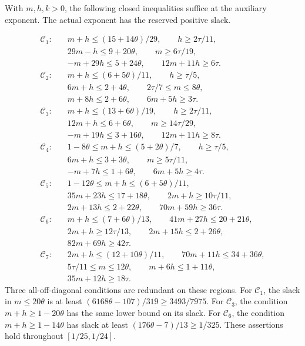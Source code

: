 {
With $m,h,k>0$, the following closed inequalities suffice at the
auxiliary exponent. The actual exponent has the reserved positive slack.\par}
\begin{align*}
\mathcal C_1:\quad
 &m+h\le(15+14\theta)/29,\qquad h\ge2\tau/11,\\
 &29m-h\le9+20\theta,\qquad m\ge6\tau/19,\\
 &-m+29h\le5+24\theta,\qquad12m+11h\ge6\tau.\\[4pt]
\mathcal C_2:\quad
 &m+h\le(6+5\theta)/11,\qquad h\ge\tau/5,\\
 &6m+h\le2+4\theta,\qquad2\tau/7\le m\le8\theta,\\
 &m+8h\le2+6\theta,\qquad6m+5h\ge3\tau.\\[4pt]
\mathcal C_3:\quad
 &m+h\le(13+6\theta)/19,\qquad h\ge2\tau/11,\\
 &12m+h\le6+6\theta,\qquad m\ge14\tau/29,\\
 &-m+19h\le3+16\theta,\qquad12m+11h\ge8\tau.\\[4pt]
\mathcal C_4:\quad
 &1-8\theta\le m+h\le(5+2\theta)/7,\qquad h\ge\tau/5,\\
 &6m+h\le3+3\theta,\qquad m\ge5\tau/11,\\
 &-m+7h\le1+6\theta,\qquad6m+5h\ge4\tau.\\[4pt]
\mathcal C_5:\quad
 &1-12\theta\le m+h\le(6+5\theta)/11,\\
 &35m+23h\le17+18\theta,\qquad2m+h\ge10\tau/11,\\
 &2m+13h\le2+22\theta,\qquad70m+59h\ge36\tau.\\[4pt]
\mathcal C_6:\quad
 &m+h\le(7+6\theta)/13,\qquad41m+27h\le20+21\theta,\\
 &2m+h\ge12\tau/13,\qquad2m+15h\le2+26\theta,\\
 &82m+69h\ge42\tau.\\[4pt]
\mathcal C_7:\quad
 &2m+h\le(12+10\theta)/11,\qquad70m+11h\le34+36\theta,\\
 &5\tau/11\le m\le12\theta,\qquad m+6h\le1+11\theta,\\
 &35m+12h\ge18\tau.
\end{align*}
Three all-off-diagonal conditions are redundant on these regions.
For $\mathcal C_1$, the slack in $m\le20\theta$ is at least
$(6168\theta-107)/319\ge3493/7975$.
For $\mathcal C_3$, the condition $m+h\ge1-20\theta$ has the same
lower bound on its slack. For $\mathcal C_6$, the condition
$m+h\ge1-14\theta$ has slack at least
$(176\theta-7)/13\ge1/325$.
These assertions hold throughout $[1/25,1/24]$.

